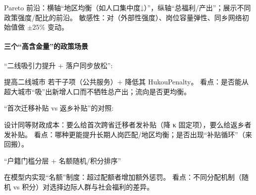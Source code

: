 \documentclass[master, final]{zufe-thesis}
\begin{document}
Pareto 前沿：横轴“地区均衡（如人口集中度↓）”，纵轴“总福利/产出”；展示不同政策强度/配比的前沿。
敏感性：对（外部性强度）、岗位容量弹性、同乡网络初始值做 $\pm 25\%$ 变动。

\paragraph{三个“高含金量”的政策场景}

“二线吸引力提升 + 落户同步放松”:

提高二线城市  若干子项（公共服务）+ 降低其 HukouPenalty。
看点：是否能从超大城市“吸”出新增人口而不牺牲总产出；流向是否更均衡。

“首次迁移补贴 vs 返乡补贴”的对照:

设计同等财政成本：要么给首次跨省迁移者发补贴（降 
κ 固定项），要么给返乡者发补贴。
看点：哪种更能提升长期人岗匹配/地区均衡；是否出现“补贴循环”（来回搬）。

“户籍门槛分层 + 名额随机/积分排序”

在模型内实现“名额”制度：超过配额者增加额外惩罚。
看点：不同分配机制（随机 vs 积分）对选择边际人群与社会福利的差异。








\end{document}
